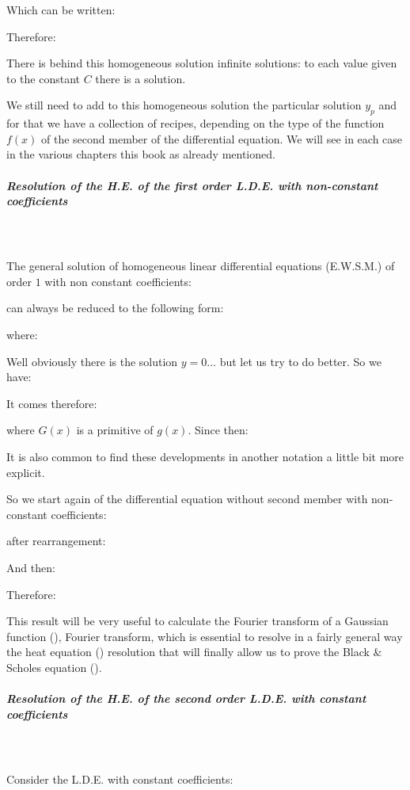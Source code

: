	Which can be written:
	
	Therefore:
	
	There is behind this homogeneous solution infinite solutions: to each value given to the constant $C$ there is a solution.
	
	We still need to add to this homogeneous solution the particular solution $y_p$ and for that we have a collection of recipes, depending on the type of the function $f (x)$ of the second member of the differential equation. We will see in each case in the various chapters this book as already mentioned.
	
	\subparagraph{Resolution of the H.E. of the first order L.D.E. with non-constant coefficients}\mbox{}\\\\
	The general solution of homogeneous linear differential equations (E.W.S.M.) of order $1$ with non constant coefficients:
	
	can always be reduced to the following form:
	
	where:
	
	Well obviously there is the solution $y=0$... but let us try to do better. So we have:
	
	It comes therefore:
	
	where $G (x)$ is a primitive of $g (x)$. Since then:
	
	It is also common to find these developments in another notation a little bit more explicit.
	
	So we start again of the differential equation without second member with non-constant coefficients:
	
	after rearrangement:
	
	And then:
	
	Therefore:
	
	This result will be very useful to calculate the Fourier transform of a Gaussian function (), Fourier transform, which is essential to resolve in a fairly general way the heat equation () resolution that will finally allow us to prove the Black \& Scholes equation (). 
	
	\subparagraph{Resolution of the H.E. of the second order L.D.E. with constant coefficients}\mbox{}\\\\\label{second order differential equations}
	Consider the L.D.E. with constant coefficients:
	
